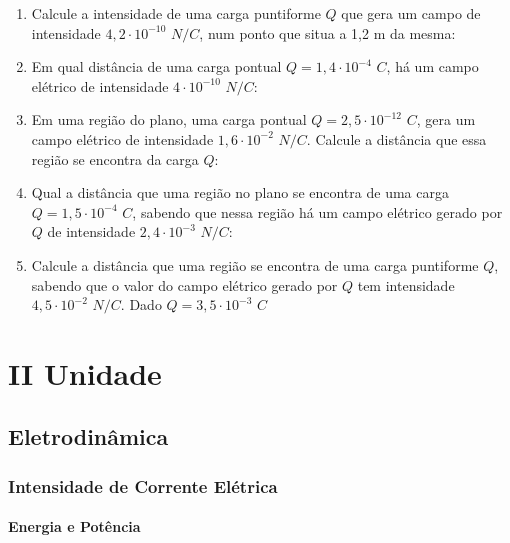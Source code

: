 \documentclass[12pt,a4paper]{book}
\begin{document}
\begin{enumerate}
	\item Calcule a intensidade de uma carga puntiforme $Q$ que gera um campo de intensidade $4,2 \cdot 10^{-10}$ $N/C$, num ponto que situa a 1,2 m da mesma:
	
	\item Em qual distância de uma carga pontual $Q = 1,4 \cdot 10^{-4}$ $C$, há um campo elétrico de intensidade  $4 \cdot 10^{-10}$ $N/C$:
	
	\item Em uma região do plano, uma carga pontual $Q = 2,5 \cdot 10^{-12}$ $C$, gera um campo elétrico de intensidade  $1,6 \cdot 10^{-2}$ $N/C$. Calcule a distância que essa região se encontra da carga $Q$:
	
	\item Qual a distância que uma região no plano se encontra de uma carga $Q = 1,5 \cdot 10^{-4}$ $C$, sabendo que nessa região há um campo elétrico gerado por $Q$ de intensidade $2,4 \cdot 10^{-3}$ $N/C$:
	
	\item Calcule a distância que uma região se encontra de uma carga puntiforme $Q$, sabendo que o valor do campo elétrico gerado por $Q$ tem intensidade $4,5 \cdot 10^{-2}$ $N/C$. Dado $Q = 3,5 \cdot 10^{-3}$ $C$ 
			
	\end{enumerate}


\part*{II Unidade}
\chapter{Eletrodinâmica}

	\section{Intensidade de Corrente Elétrica}
		
		\subsection{Energia e Potência}
\end{document}
